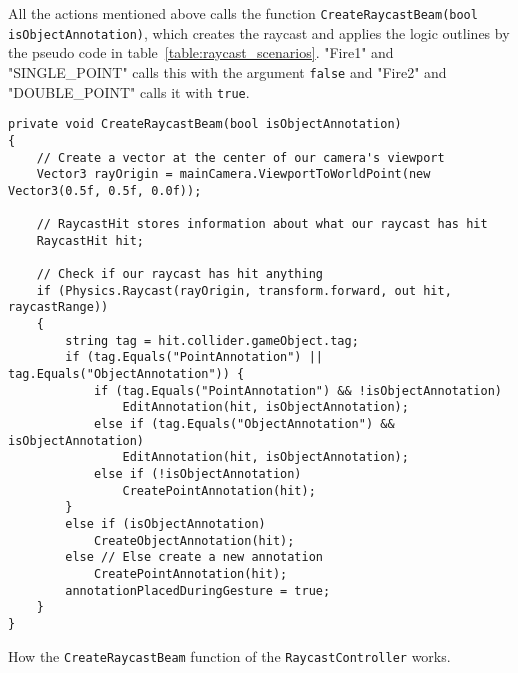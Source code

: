 All the actions mentioned above calls the function \texttt{CreateRaycastBeam(bool isObjectAnnotation)}, which creates the raycast and applies the logic outlines by the 
pseudo code in table~\vref{table:raycast_scenarios}. 
"Fire1" and "SINGLE\_POINT" calls this with the argument \texttt{false} and "Fire2" and "DOUBLE\_POINT" calls it with \texttt{true}.

\begin{table}
\label{table:create_raycast}
\lstset{style=csharp}
\begin{lstlisting}
private void CreateRaycastBeam(bool isObjectAnnotation)
{
    // Create a vector at the center of our camera's viewport
    Vector3 rayOrigin = mainCamera.ViewportToWorldPoint(new Vector3(0.5f, 0.5f, 0.0f));

    // RaycastHit stores information about what our raycast has hit
    RaycastHit hit;

    // Check if our raycast has hit anything
    if (Physics.Raycast(rayOrigin, transform.forward, out hit, raycastRange))
    {
        string tag = hit.collider.gameObject.tag;    
        if (tag.Equals("PointAnnotation") || tag.Equals("ObjectAnnotation")) {
            if (tag.Equals("PointAnnotation") && !isObjectAnnotation)
                EditAnnotation(hit, isObjectAnnotation);
            else if (tag.Equals("ObjectAnnotation") && isObjectAnnotation)
                EditAnnotation(hit, isObjectAnnotation);
            else if (!isObjectAnnotation)
                CreatePointAnnotation(hit);
        }
        else if (isObjectAnnotation)
            CreateObjectAnnotation(hit);
        else // Else create a new annotation
            CreatePointAnnotation(hit);
        annotationPlacedDuringGesture = true;
    }
} 
\end{lstlisting}
\caption[How the \texttt{CreateRaycastBeam} function of the \texttt{RaycastController} works.]{How the \texttt{CreateRaycastBeam} function of the \texttt{RaycastController} works.} 
\end{table}


